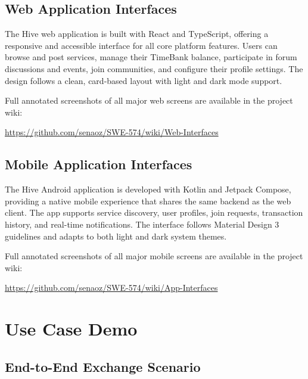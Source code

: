 \documentclass[11pt,a4paper]{report}
\begin{document}
\section{Web Application Interfaces}

The Hive web application is built with React and TypeScript, offering a responsive and accessible interface for all core platform features. Users can browse and post services, manage their TimeBank balance, participate in forum discussions and events, join communities, and configure their profile settings. The design follows a clean, card-based layout with light and dark mode support.

Full annotated screenshots of all major web screens are available in the project wiki:

\url{https://github.com/senaoz/SWE-574/wiki/Web-Interfaces}

\section{Mobile Application Interfaces}

The Hive Android application is developed with Kotlin and Jetpack Compose, providing a native mobile experience that shares the same backend as the web client. The app supports service discovery, user profiles, join requests, transaction history, and real-time notifications. The interface follows Material Design 3 guidelines and adapts to both light and dark system themes.

Full annotated screenshots of all major mobile screens are available in the project wiki:

\url{https://github.com/senaoz/SWE-574/wiki/App-Interfaces}

\chapter{Use Case Demo}
\label{chap:usecase}

\section{End-to-End Exchange Scenario}
\end{document}
